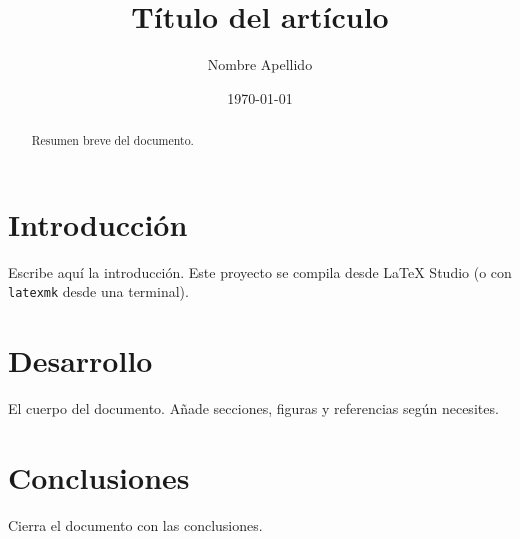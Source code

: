 \documentclass[11pt,a4paper]{article}
\title{Título del artículo}
\author{Nombre Apellido}
\date{\today}
\begin{document}
\maketitle

\begin{abstract}
Resumen breve del documento.
\end{abstract}

\section{Introducción}
Escribe aquí la introducción. Este proyecto se compila desde LaTeX Studio
(o con \texttt{latexmk} desde una terminal).

\section{Desarrollo}
El cuerpo del documento. Añade secciones, figuras y referencias según
necesites.

\section{Conclusiones}
Cierra el documento con las conclusiones.
\end{document}
